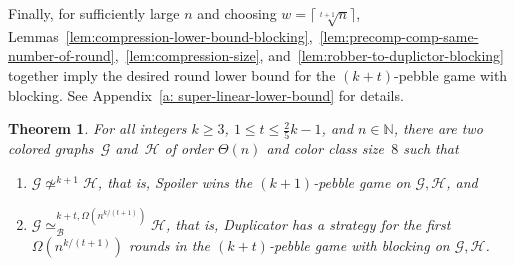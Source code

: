\documentclass[10pt,a4paper]{article}
\newcommand{\comp}{\equiv}
\newcommand{\CFIsym}{\mathsf{CFI}}
\newcommand{\CFI}[1]{\CFIsym(#1)}
\newcommand{\compCFI}[2]{\CFI{#1}/_{#2}}
\newcommand{\nat}{\mathbb{N}}
\newcommand{\FF}{\mathbb{F}}
\newcommand{\graphG}{\mathcal{G}}
\newcommand{\graphH}{\mathcal{H}}
\newcommand{\edgeC}{E_{\mathcal{C}}}
\newcommand{\kbequivr}[2]{\simeq_{\mathcal{B}}^{#1,#2}}
\newcommand{\notkequiv}[1]{\not\simeq^{#1}}
\newtheorem{theorem}{Theorem}
\newcommand{\confORfull}[2]{#1}
\newcommand{\ifAppendix}[1]{#1}
\begin{document}
\noindent Finally, for sufficiently large $n$ and choosing $w = \lceil\sqrt[t+1]{n} \rceil$,
Lemmas~\ref{lem:compression-lower-bound-blocking},~\ref{lem:precomp-comp-same-number-of-round},~\ref{lem:compression-size}, and~\ref{lem:robber-to-duplictor-blocking}
together imply the desired round lower bound for 
the $(k+t)$-pebble game with blocking. \ifAppendix{See Appendix~\ref{a: super-linear-lower-bound} for details.}
%
\begin{theorem}
        \label{thm:compression-blocking-summary}
        For all integers $k\geq 3$, $1\leq t \leq \frac{2}{5}k-1$, and $n\in \nat$,
        there are  
        two colored graphs~$\graphG$ and~$\graphH$ of order $\Theta(n)$ and color class size~$8$
        such that
        \begin{enumerate}
                \item $\graphG \notkequiv{k+1} \graphH$, that is, Spoiler wins the $(k+1)$-pebble game on $\graphG, \graphH$,
                and 
                \item $\graphG \kbequivr{k+t}{\Omega(n^{k/(t+1)})} \graphH $,
                that is, Duplicator has a strategy for the first $\Omega(n^{k/(t+1)})$
                rounds in the $(k+t)$-pebble game with blocking on $\graphG, \graphH$.
        \end{enumerate}
\end{theorem}
\confORfull{}{
\begin{proof}
        Let $k \geq 3$, $1\leq t \leq  \frac{2}{5}k-1$, and $n \in \nat$.
        If $n$ is sufficiently large,
        for $w = \lceil\sqrt[t+1]{n} \rceil$ the required pairwise coprime numbers $p_1,\dots, p_k$ exist~\cite{DBLP:conf/focs/GroheLNS23}.
        Let $J = f(k) p_1\cdot\ldots \cdot p_k$
        and $\mathcal{C}$ be the $k\times J$ cylindrical grid.
        Also, let $\comp^t$ be the compression defined earlier with respect
        to $p_1,\dots, p_k$.
        By Lemma~\ref{lem:compression-lower-bound-blocking},
        the robber has a strategy for the first $\Omega( J) = \Omega(w^k) = \Omega(n^{k/(t+1)})$
        rounds in the compressed and blocking $(k+t)$-Cops and Robber game
        on $\mathcal{C}$ and $\comp^t$, when the robber is placed on the left or right end. 
        
        Now let $e$ be an edge in the left end,
        $f,g \, \colon \edgeC \to \FF_2$ only twist $e$,
        and set $\graphG :=\compCFI{\mathcal{C},f}{\comp^t}$ and $\graphH :=\compCFI{\mathcal{C},f}{\comp^t}$.
        By Lemmas~\ref{lem:precomp-comp-same-number-of-round}
        and~\ref{lem:robber-to-duplictor-blocking},
        Duplicator has a strategy for the first  $\Omega(n^{k/(t+1)})$
        rounds of the $(k+t)$-pebble game with blocking
        on $\graphG$ and $\graphH$.
        It is known that Spoiler wins the $(k+1)$-pebble game
        on CFI graphs over cylindrical grids and thus over the compressed ones
        by Lemma~\ref{lem:precomp-comp-same-number-of-round}.
        By Lemma~\ref{lem:compression-size},
        the graphs $\graphG$ and $\graphH$ have size $\Theta(n)$
        and are of color class size $8$.
\end{proof}}
\end{document}
